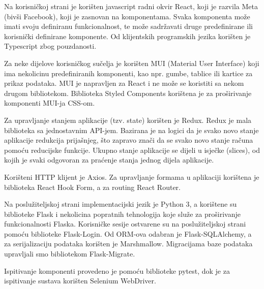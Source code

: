                 \par    Na korisničkoj strani je korišten javascript radni okvir React, koji je razvila Meta (bivši Facebook), koji je 
                zasnovan na komponentama. Svaka komponenta može imati svoju definiranu funkcionalnost, te može sadržavati druge predefinirane 
                ili korisnički definirane komponente. Od klijentskih programskih jezika korišten je Typescript zbog pouzdanosti.

                \par    Za neke dijelove korisničkog sučelja je korišten MUI (Material User Interface) koji ima nekolicinu predefiniranih
                komponenti, kao npr. gumbe, tablice ili kartice za prikaz podataka. MUI je napravljen za React i ne može se koristiti
                sa nekom drugom bibliotekom. Biblioteka Styled Components korištena je za proširivanje komponenti MUI-ja CSS-om.

                \par    Za upravljanje stanjem aplikacije (tzv. state) korišten je Redux. Redux je mala biblioteka sa jednostavnim API-jem.
                Bazirana je na logici da je svako novo stanje aplikacije redukcija prijašnjeg, što zapravo znači da se
                svako novo stanje računa pomoću reducijske funkcije. Ukupno stanje aplikacije se 
                dijeli u isječke (slices), od kojih je svaki odgovoran za praćenje stanja jednog dijela aplikacije.

                \par   Korišteni HTTP klijent je Axios. Za upravljanje formama u aplikaciji korištena je biblioteka React Hook Form, a za routing React Router.

                \par    Na poslužiteljskoj strani implementacijski jezik je Python 3, a korištene su biblioteke Flask i nekolicina popratnih
                tehnologija koje služe za proširivanje funkcionalnosti Flaska. Korisničke sesije ostvarene su na poslužiteljskoj strani pomoću biblioteke Flask-Login. Od ORM-ova odabran je Flask-SQLAlchemy, a za serijalizaciju podataka korišten je Marshmallow. Migracijama baze podataka upravljali smo bibliotekom Flask-Migrate.

                \par    Ispitivanje komponenti provedeno je pomoću biblioteke pytest, dok je za ispitivanje sustava korišten Selenium WebDriver.

